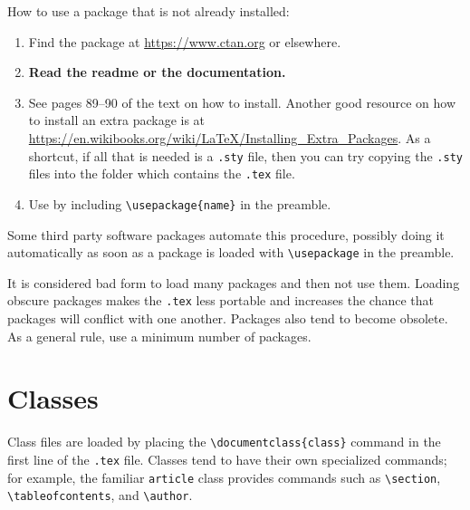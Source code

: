 \documentclass[11pt]{paper}
\begin{document}
How to use a package that is not already installed:
\begin{enumerate}[labelindent = \parindent, leftmargin = *, label={\arabic*.}]
\item Find the package at \url{https://www.ctan.org} or elsewhere.
\item \textbf{Read the readme or the documentation.}
\item See pages 89--90 of the text on how to install.  Another good resource on
  how to install an extra package is at
  \url{https://en.wikibooks.org/wiki/LaTeX/Installing_Extra_Packages}.  As a
  shortcut, if all that is needed is a \verb~.sty~ file, then you can try
  copying the \verb~.sty~ files into the folder which contains the \verb~.tex~
  file.
\item Use by including \verb~\usepackage{name}~ in the preamble.
\end{enumerate}
Some third party software packages automate this procedure, possibly doing it
automatically as soon as a package is loaded with \verb~\usepackage~ in the
preamble.

It is considered bad form to load many packages and then not use them.  Loading
obscure packages makes the \verb~.tex~ less portable and increases the chance
that packages will conflict with one another.  Packages also tend to become
obsolete.  As a general rule, use a minimum number of packages.

\section{Classes}

Class files are loaded by placing the \verb~\documentclass{class}~ command in
the first line of the \verb~.tex~ file.  Classes tend to have their own
specialized commands; for example, the familiar \verb~article~ class provides
commands such as \verb~\section~, \verb~\tableofcontents~, and \verb~\author~.
\end{document}
